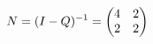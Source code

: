 \documentclass[preview]{standalone}
\begin{document}
\begin{align*}
\special{dvisvgm:raw <g id='unique000'>}N=(I-Q)^{-1}=\begin{pmatrix}4&2\\2&2\end{pmatrix}\special{dvisvgm:raw </g>}
\end{align*}
\end{document}
